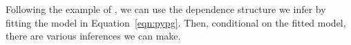 \begin{comment}
                \item need to make a statement harkening back to the fact this is a simulation of
                    storm parameters sampled via latin hypercube, so the definition of 'return period'
                    in this context is suspect.
            \end{itemize}
            \item Given shaky conception of multivariate return period, we might consider alternative 
                definitions more relevant to an inundation field.
            \begin{itemize}
                \item Total Inundation field?  (some univariate transformation?)
                \item number of locales under significant flooding?
            \end{itemize}
        \end{itemize}
        \item Application results
    \end{itemize}
\end{comment}

Following the example of \cite{trubey:pg}, we can use the dependence structure we infer
    by fitting the model in Equation~\eqref{eqn:pypg}.  Then, conditional on the fitted model,
    there are various inferences we can make.


